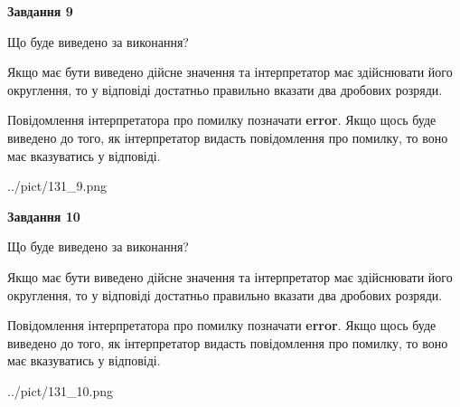 \documentclass[12pt, ukrainian]{article}
\begin{document}
{\begin {Large}
{\begin {center}\textbf{Завдання 9}\end {center}}\par
Що буде виведено за виконання? \par

Якщо має бути виведено дійсне значення та інтерпретатор має здійснювати його округлення, 
то у відповіді достатньо правильно вказати два дробових розряди.

Повідомлення інтерпретатора про помилку позначати \textbf{error}.
Якщо щось буде виведено до того, як інтерпретатор видасть повідомлення про помилку, 
то воно має вказуватись у відповіді. \par

\begin{center}
	{../pict/131_9.png}
\end{center}
\newpage

{\begin {center}\textbf{Завдання 10}\end {center}}\par
Що буде виведено за виконання? \par

Якщо має бути виведено дійсне значення та інтерпретатор має здійснювати його округлення, 
то у відповіді достатньо правильно вказати два дробових розряди.

Повідомлення інтерпретатора про помилку позначати \textbf{error}.
Якщо щось буде виведено до того, як інтерпретатор видасть повідомлення про помилку, 
то воно має вказуватись у відповіді. \par

\begin{center}
	{../pict/131_10.png}
\end{center}
\newpage

\end {Large}}
\end{document}
